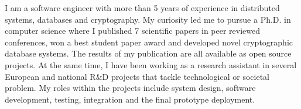 

\begin{cvparagraph}
I am a software engineer with more than 5 years of experience in distributed systems, databases and cryptography. My curiosity led me to pursue a Ph.D. in computer science where I published 7 scientific papers in peer reviewed conferences, won a best student paper award and developed novel cryptographic database systems. The results of my publication are all available as open source projects. At the same time, I have been working as a research assistant in several European and national R\&D projects that tackle technological or societal problem. My roles within the projects include system design, software development, testing, integration and the final prototype deployment. 
\end{cvparagraph}
